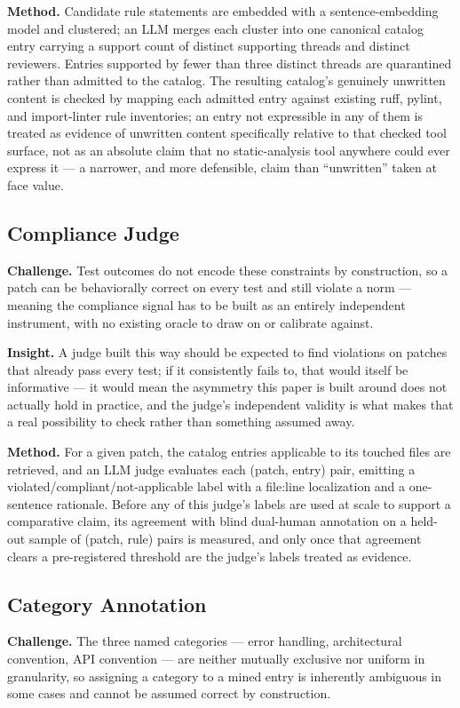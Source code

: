 \documentclass[11pt]{article}
\begin{document}
\textbf{Method.} Candidate rule statements are embedded with a sentence-embedding model and clustered; an LLM merges each cluster into one canonical catalog entry carrying a support count of distinct supporting threads and distinct reviewers. Entries supported by fewer than three distinct threads are quarantined rather than admitted to the catalog. The resulting catalog's genuinely unwritten content is checked by mapping each admitted entry against existing ruff, pylint, and import-linter rule inventories; an entry not expressible in any of them is treated as evidence of unwritten content specifically relative to that checked tool surface, not as an absolute claim that no static-analysis tool anywhere could ever express it --- a narrower, and more defensible, claim than ``unwritten'' taken at face value.

\subsection{Compliance Judge}
\textbf{Challenge.} Test outcomes do not encode these constraints by construction, so a patch can be behaviorally correct on every test and still violate a norm --- meaning the compliance signal has to be built as an entirely independent instrument, with no existing oracle to draw on or calibrate against.

\textbf{Insight.} A judge built this way should be expected to find violations on patches that already pass every test; if it consistently fails to, that would itself be informative --- it would mean the asymmetry this paper is built around does not actually hold in practice, and the judge's independent validity is what makes that a real possibility to check rather than something assumed away.

\textbf{Method.} For a given patch, the catalog entries applicable to its touched files are retrieved, and an LLM judge evaluates each (patch, entry) pair, emitting a violated/compliant/not-applicable label with a file:line localization and a one-sentence rationale. Before any of this judge's labels are used at scale to support a comparative claim, its agreement with blind dual-human annotation on a held-out sample of (patch, rule) pairs is measured, and only once that agreement clears a pre-registered threshold are the judge's labels treated as evidence.

\subsection{Category Annotation}
\textbf{Challenge.} The three named categories --- error handling, architectural convention, API convention --- are neither mutually exclusive nor uniform in granularity, so assigning a category to a mined entry is inherently ambiguous in some cases and cannot be assumed correct by construction.
\end{document}
